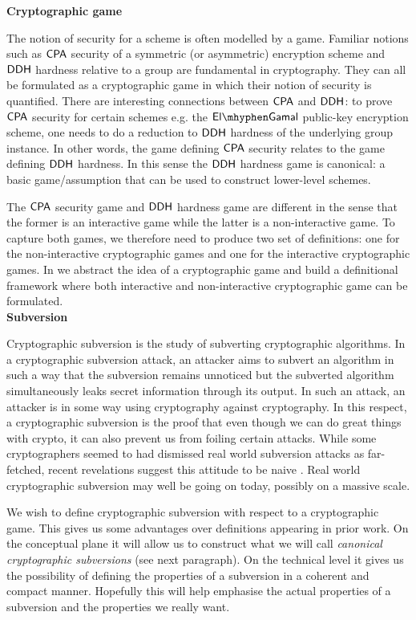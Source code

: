 \noindent\textbf{Cryptographic game} 

The notion of security for a scheme is often modelled by a game. Familiar notions such as $\mathsf{CPA}$ security of a symmetric (or asymmetric) encryption scheme and $\mathsf{DDH}$ hardness relative to a group are fundamental in cryptography. They can all be formulated as a cryptographic game in which their notion of security is quantified. There are interesting connections between $\mathsf{CPA}$ and $\mathsf{DDH}$: to prove $\mathsf{CPA}$ security for certain schemes e.g. the $\elGamal$ public-key encryption scheme, one needs to do a reduction to $\mathsf{DDH}$ hardness of the underlying group instance. In other words, the game defining $\mathsf{CPA}$ security relates to the game defining $\mathsf{DDH}$ hardness. In this sense the $\mathsf{DDH}$ hardness game is canonical: a basic game/assumption that can be used to construct lower-level schemes.

The $\mathsf{CPA}$ security game and $\mathsf{DDH}$ hardness game are different in the sense that the former is an interactive game while the latter is a non-interactive game. To capture both games, we therefore need to produce two set of definitions: one for the non-interactive cryptographic games and one for the interactive cryptographic games.  In  we abstract the idea of a cryptographic game and build a definitional framework where both interactive and non-interactive cryptographic game can be formulated. \\

\noindent\textbf{Subversion}

Cryptographic subversion is the study of subverting cryptographic algorithms. In a cryptographic subversion attack, an attacker aims to subvert an algorithm in such a way that the subversion remains unnoticed but the subverted algorithm simultaneously leaks secret information through its output. In such an attack, an attacker is in some way using cryptography against cryptography. In this respect, a cryptographic subversion is the proof that even though we can do great things with crypto, it can also prevent us from foiling certain attacks. While some cryptographers seemed to had dismissed real world subversion attacks as far-fetched, recent revelations suggest this attitude to be naive \cite{BBG}. Real world cryptographic subversion may well be going on today, possibly on a massive scale. 

We wish to define cryptographic subversion with respect to a cryptographic game. This gives us some advantages over definitions appearing in prior work. On the conceptual plane it will allow us to construct what we will call \emph{canonical cryptographic subversions} (see next paragraph). On the technical level it gives us the possibility of defining the properties of a subversion in a coherent and compact manner. Hopefully this will help emphasise the actual properties of a subversion and the properties we really want. 

